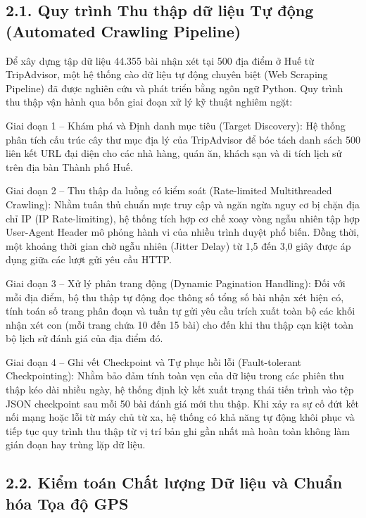 \subsection*{2.1. Quy trình Thu thập dữ liệu Tự động (Automated Crawling Pipeline)}
{}

Để xây dựng tập dữ liệu 44.355 bài nhận xét tại 500 địa điểm ở Huế từ TripAdvisor, một hệ thống cào dữ liệu tự động chuyên biệt (Web Scraping Pipeline) đã được nghiên cứu và phát triển bằng ngôn ngữ Python. Quy trình thu thập vận hành qua bốn giai đoạn xử lý kỹ thuật nghiêm ngặt:

Giai đoạn 1 -- Khám phá và Định danh mục tiêu (Target Discovery): Hệ thống phân tích cấu trúc cây thư mục địa lý của TripAdvisor để bóc tách danh sách 500 liên kết URL đại diện cho các nhà hàng, quán ăn, khách sạn và di tích lịch sử trên địa bàn Thành phố Huế.

Giai đoạn 2 -- Thu thập đa luồng có kiểm soát (Rate-limited Multithreaded Crawling): Nhằm tuân thủ chuẩn mực truy cập và ngăn ngừa nguy cơ bị chặn địa chỉ IP (IP Rate-limiting), hệ thống tích hợp cơ chế xoay vòng ngẫu nhiên tập hợp User-Agent Header mô phỏng hành vi của nhiều trình duyệt phổ biến. Đồng thời, một khoảng thời gian chờ ngẫu nhiên (Jitter Delay) từ 1,5 đến 3,0 giây được áp dụng giữa các lượt gửi yêu cầu HTTP.

Giai đoạn 3 -- Xử lý phân trang động (Dynamic Pagination Handling): Đối với mỗi địa điểm, bộ thu thập tự động đọc thông số tổng số bài nhận xét hiện có, tính toán số trang phân đoạn và tuần tự gửi yêu cầu trích xuất toàn bộ các khối nhận xét con (mỗi trang chứa 10 đến 15 bài) cho đến khi thu thập cạn kiệt toàn bộ lịch sử đánh giá của địa điểm đó.

Giai đoạn 4 -- Ghi vết Checkpoint và Tự phục hồi lỗi (Fault-tolerant Checkpointing): Nhằm bảo đảm tính toàn vẹn của dữ liệu trong các phiên thu thập kéo dài nhiều ngày, hệ thống định kỳ kết xuất trạng thái tiến trình vào tệp JSON checkpoint sau mỗi 50 bài đánh giá mới thu thập. Khi xảy ra sự cố đứt kết nối mạng hoặc lỗi từ máy chủ từ xa, hệ thống có khả năng tự động khôi phục và tiếp tục quy trình thu thập từ vị trí bản ghi gần nhất mà hoàn toàn không làm gián đoạn hay trùng lặp dữ liệu.

\subsection*{2.2. Kiểm toán Chất lượng Dữ liệu và Chuẩn hóa Tọa độ GPS}
{}

